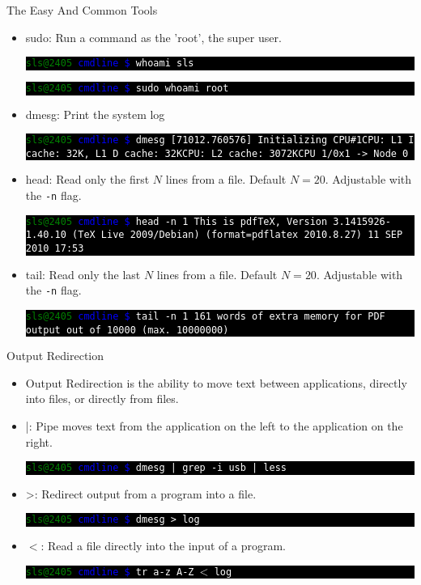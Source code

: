 \documentclass[10pt]{beamer}
\makeatletter
\newcommand{\codeblock}[1]
{
  \colorbox{black}{
    \begin{minipage}{\linewidth}
      \texttt{\textcolor{green}{sls@2405} \textcolor{blue}{cmdline \$} \textcolor{white}{#1}}
    \end{minipage}
  }
}
\newcommand{\codeblockWO}[2]
{
  \colorbox{black}{
    \begin{minipage}{\linewidth}
      \texttt{\textcolor{green}{sls@2405} \textcolor{blue}{cmdline \$} \textcolor{white}{#1}
      \newline
      \textcolor{white}{#2}}
    \end{minipage}
  }
}
\makeatother
\begin{document}
\begin{frame}[allowframebreaks]{The Easy And Common Tools}
\begin{itemize}
\item sudo: Run a command as the 'root', the super user.
\codeblockWO{whoami}{sls}
\codeblockWO{sudo whoami}{root}

\item dmesg: Print the system log
\codeblockWO{dmesg}{[71012.760576] Initializing CPU\#1\newline
[71012.760576] CPU: L1 I cache: 32K, L1 D cache: 32K\newline
[71012.760576] CPU: L2 cache: 3072K\newline
[71012.760576] CPU 1/0x1 -> Node 0}

\item head: Read only the first $N$ lines from a file. Default $N=20$. Adjustable with the \texttt{-n} flag.
\codeblockWO{head -n 1}{This is pdfTeX, Version 3.1415926-1.40.10 (TeX Live 2009/Debian) (format=pdflatex 2010.8.27)  11 SEP 2010 17:53}

\item tail: Read only the last $N$ lines from a file. Default $N=20$. Adjustable with the \texttt{-n} flag.
\codeblockWO{tail -n 1}{161 words of extra memory for PDF output out of 10000 (max. 10000000)}

\end{itemize}
\end{frame}

\begin{frame}{Output Redirection}
\begin{itemize}
\item Output Redirection is the ability to move text between applications, directly into files, or directly from files.

\item |: Pipe moves text from the application on the left to the application on the right.
\codeblock{dmesg | grep -i usb | less}

\item >: Redirect output from a program into a file.
\codeblock{dmesg > log}

\item $<$: Read a file directly into the input of a program.
\codeblock{tr a-z A-Z $\texttt{<}$ log}
\end{itemize}
\end{frame}
\end{document}
